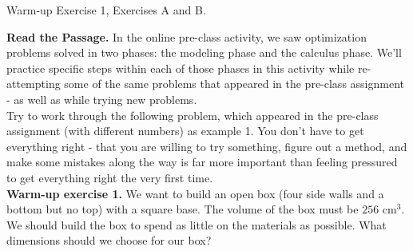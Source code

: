 \documentclass[10pt]{article}
\begin{document}
\core Warm-up Exercise 1, Exercises A and B.


\newpage
{\bf\color{blue}Read the Passage.} In the online pre-class activity, we saw optimization problems solved in two phases: the modeling phase and the calculus phase. We'll practice specific steps within each of those phases in this activity while re-attempting some of the same problems that appeared in the pre-class assignment - as well as while trying new problems.\\

Try to work through the following problem, which appeared in the pre-class assignment (with different numbers) as example 1. You don't have to get everything right - that you are willing to try something, figure out a method, and make some mistakes along the way is far more important than feeling pressured to get everything right the very first time.\\

{\bf\color{blue}Warm-up exercise 1.} We want to build an open box (four side walls and a bottom but no top) with a square base. The volume of the box must be $256$ cm$^3$. We should build the box to spend as little on the materials as possible. What dimensions should we choose for our box?\\
\end{document}
